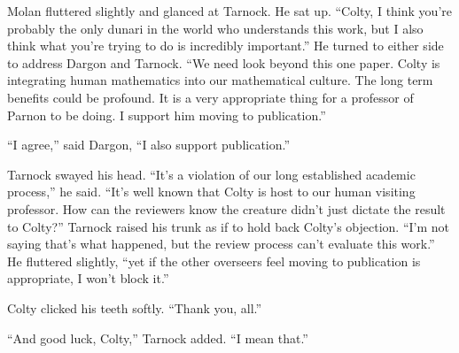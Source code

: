 Molan fluttered slightly and glanced at Tarnock. He sat up. ``Colty, I think you're probably the
only dunari in the world who understands this work, but I also think what you're trying to do is
incredibly important.'' He turned to either side to address Dargon and Tarnock. ``We need look
beyond this one paper. Colty is integrating human mathematics into our mathematical culture. The
long term benefits could be profound. It is a very appropriate thing for a professor of Parnon
to be doing. I support him moving to publication.''

``I agree,'' said Dargon, ``I also support publication.''

Tarnock swayed his head. ``It's a violation of our long established academic process,'' he said.
``It's well known that Colty is host to our human visiting professor. How can the reviewers know
the creature didn't just dictate the result to Colty?'' Tarnock raised his trunk as if to hold
back Colty's objection. ``I'm not saying that's what happened, but the review process can't
evaluate this work.'' He fluttered slightly, ``yet if the other overseers feel moving to
publication is appropriate, I won't block it.''

Colty clicked his teeth softly. ``Thank you, all.''

``And good luck, Colty,'' Tarnock added. ``I mean that.''

